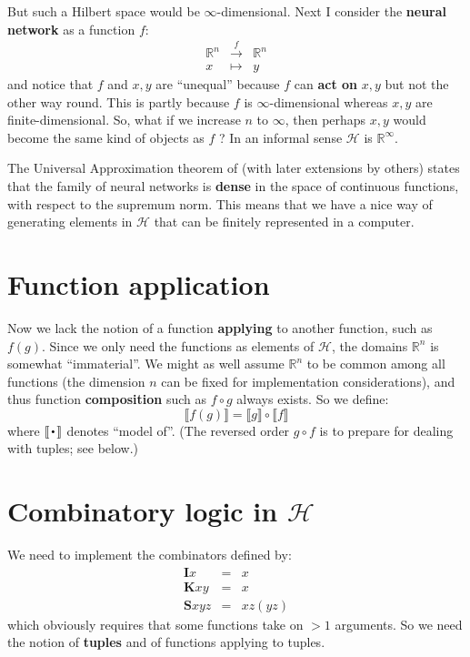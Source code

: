 But such a Hilbert space would be $\infty$-dimensional.  Next I consider the \textbf{neural network} as a function $f$:
\begin{eqnarray}
\mathbb{R}^n & \stackrel{f}{\longrightarrow} & \mathbb{R}^n \\
x & \mapsto & y \nonumber
\end{eqnarray}
and notice that $f$ and $x, y$ are ``unequal'' because $f$ can \textbf{act on} $x, y$ but not the other way round.  This is partly because $f$ is $\infty$-dimensional whereas $x, y$ are finite-dimensional.  So, what if we increase $n$ to $\infty$, then perhaps $x, y$ would become the same kind of objects as $f$ ?  In an informal sense $\mathcal{H}$ is $\mathbb{R}^{\infty}$.

The Universal Approximation theorem of \parencite{Cybenko1989} (with later extensions by others) states that the family of neural networks is \textbf{dense} in the space of continuous functions, with respect to the supremum norm.  This means that we have a nice way of generating elements in $\mathcal{H}$ that can be finitely represented in a computer.

\section{Function application}

Now we lack the notion of a function \textbf{applying} to another function, such as $f(g)$.  Since we only need the functions as elements of $\mathcal{H}$, the domains $\mathbb{R}^n$ is somewhat ``immaterial''.  We might as well assume $\mathbb{R}^n$ to be common among all functions (the dimension $n$ can be fixed for implementation considerations), and thus function \textbf{composition} such as $f \circ g$ always exists.  So we define:
\begin{equation}
\llbracket f(g) \rrbracket = \llbracket g \rrbracket \circ \llbracket f \rrbracket
\end{equation}
where $\llbracket \Cdot \rrbracket$ denotes ``model of''.  (The reversed order $g \circ f$ is to prepare for dealing with tuples; see below.)

\section{Combinatory logic in $\mathcal{H}$}

We need to implement the combinators defined by:
\begin{eqnarray}
\mathbf{I} x &=& x \nonumber \\
\mathbf{K} x y &=& x \\
\mathbf{S} x y z &=& xz (yz) \nonumber 
\end{eqnarray}
which obviously requires that some functions take on $> 1$ arguments.  So we need the notion of \textbf{tuples} and of functions applying to tuples.

